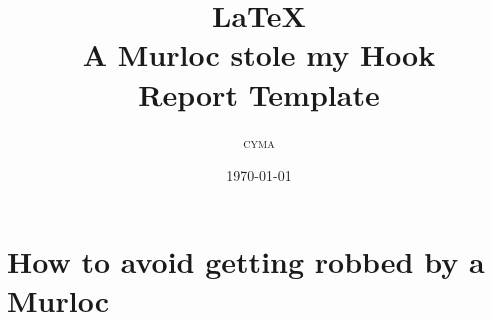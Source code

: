 \documentclass[a4paper,twoside,11pt]{article}
\title{\LaTeX{}\\A Murloc stole my Hook\\Report Template } %
\author{\textsc{cyma}} %
\date{\today} %
\begin{document}
\maketitle %


\section{How to avoid getting robbed by a Murloc}
\end{document}
